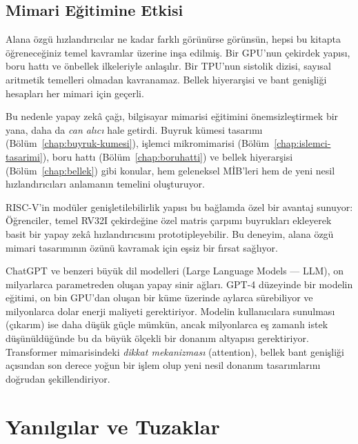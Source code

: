 \subsection{Mimari Eğitimine Etkisi}
\label{sec:degisim-egitim}

Alana özgü hızlandırıcılar ne kadar farklı görünürse görünsün, hepsi bu kitapta öğreneceğiniz temel kavramlar üzerine inşa edilmiş. Bir GPU'nun çekirdek yapısı, boru hattı ve önbellek ilkeleriyle anlaşılır. Bir TPU'nun sistolik dizisi, sayısal aritmetik temelleri olmadan kavranamaz. Bellek hiyerarşisi ve bant genişliği hesapları her mimari için geçerli.

Bu nedenle yapay zekâ çağı, bilgisayar mimarisi eğitimini önemsizleştirmek bir yana, daha da \emph{can alıcı} hale getirdi. Buyruk kümesi tasarımı (Bölüm~\ref{chap:buyruk-kumesi}), işlemci mikromimarisi (Bölüm~\ref{chap:islemci-tasarimi}), boru hattı (Bölüm~\ref{chap:boruhatti}) ve bellek hiyerarşisi (Bölüm~\ref{chap:bellek}) gibi konular, hem geleneksel MİB'leri hem de yeni nesil hızlandırıcıları anlamanın temelini oluşturuyor.

RISC-V'in modüler genişletilebilirlik yapısı bu bağlamda özel bir avantaj sunuyor: Öğrenciler, temel RV32I çekirdeğine özel matris çarpımı buyrukları ekleyerek basit bir yapay zekâ hızlandırıcısını prototipleyebilir. Bu deneyim, alana özgü mimari tasarımının özünü kavramak için eşsiz bir fırsat sağlıyor.

\begin{bilginot}
ChatGPT ve benzeri büyük dil modelleri (Large Language Models --- LLM), on milyarlarca parametreden oluşan yapay sinir ağları. GPT-4 düzeyinde bir modelin eğitimi, on bin GPU'dan oluşan bir küme üzerinde aylarca sürebiliyor ve milyonlarca dolar enerji maliyeti gerektiriyor. Modelin kullanıcılara sunulması (çıkarım) ise daha düşük güçle mümkün, ancak milyonlarca eş zamanlı istek düşünüldüğünde bu da büyük ölçekli bir donanım altyapısı gerektiriyor. Transformer mimarisindeki \emph{dikkat mekanizması} (attention), bellek bant genişliği açısından son derece yoğun bir işlem olup yeni nesil donanım tasarımlarını doğrudan şekillendiriyor.
\end{bilginot}


\section{Yanılgılar ve Tuzaklar}
\label{sec:giris-yanilgilar}

